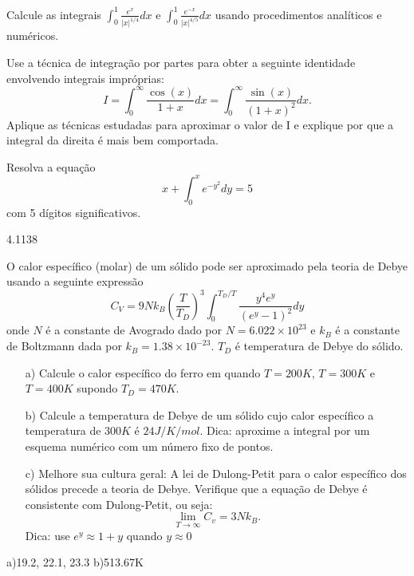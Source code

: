\begin{Exercise}Calcule as integrais $\int_0^{1}\frac{e^x}{|x|^{1/4}}dx$ e $\int_0^1\frac{e^{-x}}{|x|^{4/5}}dx$ usando procedimentos analíticos e numéricos.
\end{Exercise}

\begin{Exercise} Use a técnica de integração por partes para obter a seguinte identidade envolvendo integrais impróprias:
$$I=\int_0^\infty \frac{\cos(x)}{1+x}dx =\int_0^\infty \frac{\sin(x)}{(1+x)^2}dx.$$
Aplique as técnicas estudadas para aproximar o valor de I e explique por que a integral da direita é mais bem comportada.
\end{Exercise}

\begin{Exercise} Resolva a  equação
$$x+\int_0^x e^{-y^2}dy=5$$
com 5 dígitos significativos.
\end{Exercise}
\begin{Answer}
  \begin{tiny}
4.1138    
  \end{tiny}
\end{Answer}

\begin{Exercise} [title=Ciência dos materiais] O calor específico (molar) de um sólido pode ser aproximado pela teoria de Debye usando a seguinte expressão
$$C_V=9Nk_B\left(\frac{T}{T_D}\right)^3\int_0^{T_D/T} \frac{y^4e^y}{(e^y-1)^2}dy$$
onde $N$ é a constante de Avogrado dado por $N=6.022\times 10^{23}$ e $k_B$ é a constante de Boltzmann dada por $k_B=1.38\times 10^{-23}$. $T_D$ é temperatura de Debye do sólido.
\begin{itemize}
\item[a)] Calcule o calor específico do ferro em quando $T=200K$, $T=300K$ e $T=400K$ supondo $T_D=470K$.
\item[b)] Calcule a temperatura de Debye de um sólido cujo calor específico a temperatura de $300K$ é $24J/K/mol$. Dica: aproxime a integral por um esquema numérico com um número fixo de pontos.
\item[c)] Melhore sua cultura geral: A lei de Dulong-Petit para o calor específico dos sólidos precede a teoria de Debye. Verifique que a equação de Debye é consistente com Dulong-Petit, ou seja: $$\lim_{T\to \infty}C_v=3Nk_B.$$ Dica: use $e^y\approx 1+y$ quando $y\approx 0$
\end{itemize}

\end{Exercise}
\begin{Answer}
  \begin{tiny}
a)19.2, 22.1, 23.3 b)513.67K    
  \end{tiny}
\end{Answer}

